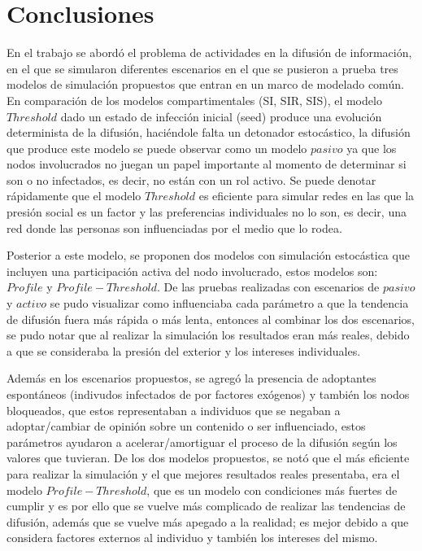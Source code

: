 \documentclass{article}
\begin{document}
\section{Conclusiones}
En el trabajo se abordó el problema de actividades en la difusión de información, en el que se simularon diferentes escenarios en el que se pusieron a prueba tres modelos de simulación propuestos que entran en un marco de modelado común. En comparación de los modelos compartimentales (SI, SIR, SIS), el modelo $Threshold$ dado un estado de infección inicial (seed) produce una evolución determinista de la difusión, haciéndole falta un detonador estocástico, la difusión que produce este modelo se puede observar como un modelo $pasivo$ ya que los nodos involucrados no juegan un papel importante al momento de determinar si son o no infectados, es decir, no están con un rol activo. Se puede denotar rápidamente que el modelo $Threshold$ es eficiente para simular redes en las que la presión social es un factor y las preferencias individuales no lo son, es decir, una red donde las personas son influenciadas por el medio que lo rodea.



Posterior a este modelo, se proponen dos modelos con simulación estocástica que incluyen una participación activa del nodo involucrado, estos modelos son: $Profile$ y $Profile-Threshold$. De las pruebas realizadas con escenarios de $pasivo$ y $activo$ se pudo visualizar como influenciaba cada parámetro a que la tendencia de difusión fuera más rápida o más lenta, entonces al combinar los dos escenarios, se pudo notar que al realizar la simulación los resultados eran más reales, debido a que se consideraba la presión del exterior y los intereses individuales.



Además en los escenarios propuestos, se agregó la presencia de adoptantes espontáneos (indivudos infectados de por factores exógenos) y también los nodos bloqueados, que estos representaban a individuos que se negaban a adoptar/cambiar de opinión sobre un contenido o ser influenciado, estos parámetros ayudaron a acelerar/amortiguar el proceso de la difusión según los valores que tuvieran. De los dos modelos propuestos, se notó que el más eficiente para realizar la simulación y el que mejores resultados reales presentaba, era el modelo $Profile-Threshold$, que es un modelo con condiciones más fuertes de cumplir y es por ello que se vuelve más complicado de realizar las tendencias de difusión, además que se vuelve más apegado a la realidad; es mejor debido a que considera factores externos al individuo y también los intereses del mismo.
	
\end{document}
